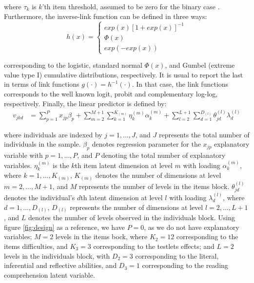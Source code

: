 \noindent where $\tau_{k}$ is $k$'th item threshold, assumed to be zero for the binary case \cite{Rabe_et_al_2004a}. Furthermore, the inverse-link function can be defined in three ways:	
\begin{equation} \label{eq:response_dich1}
	h(x) = 
	\begin{cases}
		exp(x)[1 + exp(x)]^{-1} \\
		\Phi(x)  \\
		exp(-exp(x))
	\end{cases}
\end{equation}

\noindent corresponding to the logistic, standard normal $\Phi(x)$, and Gumbel (extreme value type I) cumulative distributions, respectively. It is usual to report the last in terms of link functions $g(\cdot) = h^{-1}(\cdot)$. In that case, the link functions corresponds to the well known logit, probit and complementary log-log, respectively. Finally, the linear predictor is defined by:
\begin{equation} \label{eq:linear_predictor1}
	\begin{split}
		v_{jkd} &= \sum_{p=1}^{P} x_{jp} \beta_{p} + \sum_{m=2}^{M+1} \sum_{k=1}^{K_{(m)}} \eta_{k}^{(m)} \alpha_{k}^{(m)} + \sum_{l=2}^{L+1} \sum_{d=1}^{D_{(l)}} \theta_{jd}^{(l)} \lambda_{d}^{(l)}
	\end{split}
\end{equation}

\noindent where individuals are indexed by $j = 1, \dots, J$, and $J$ represents the total number of individuals in the sample. $\beta_{p}$ denotes regression parameter for the $x_{jp}$ explanatory variable with $p=1,\dots, P$, and $P$ denoting the total number of explanatory variables. $\eta_{k}^{(m)}$ is the $k$th item latent dimension at level $m$ with loading $\alpha_{k}^{(m)}$, where $k= 1, \dots, K_{(m)}$, $K_{(m)}$ denotes the number of dimensions at level $m=2,\dots, M+1$, and $M$ represents the number of levels in the items block. $\theta_{jd}^{(l)}$ denotes the individual's $d$th latent dimension at level $l$ with loading $\lambda_{d}^{(l)}$, where $d=1, \dots, D_{(l)}$, $D_{(l)}$ represents the number of dimensions at level $l=2, \dots, L+1$, and $L$ denotes the number of levels observed in the individuals block. Using figure \ref{fig:design} as a reference, we have $P=0$, as we do not have explanatory variables; $M=2$ levels in the items bock, where $K_{2}=12$ corresponding to the items difficulties, and $K_{3}=3$ corresponding to the testlets effects; and $L=2$ levels in the individuals block, with $D_{2}=3$ corresponding to the literal, inferential and reflective abilities, and $D_{3}=1$ corresponding to the reading comprehension latent variable.


